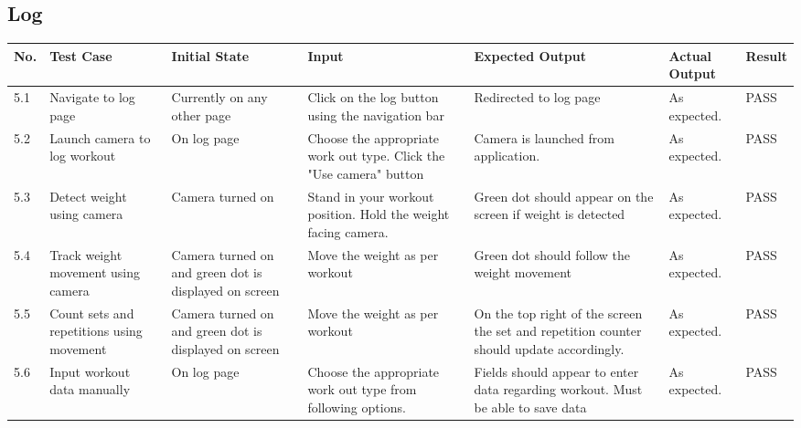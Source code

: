 \documentclass{article}
\begin{document}
\subsection{Log}
\begingroup
\begin{tabular}{ | p{0.5cm} | p{2cm} | p{2cm} | p{2cm} |p{2cm} |p{2cm} |p{1cm} |} 
    \hline
    \textbf{No.} & \textbf{Test Case} & \textbf{Initial State} & \textbf{Input}& \textbf{Expected Output}& \textbf{Actual Output}& \textbf{Result}\\
    \hline
    5.1 & Navigate to log page & Currently on any other page &  Click on the log button using the navigation bar & Redirected to log page & As expected. & PASS\\
    \hline
    5.2 & Launch camera to log workout & On log page & Choose the appropriate work out type. Click the "Use camera" button & Camera is launched from application. & As expected. & PASS\\
    \hline
    5.3 & Detect weight using camera & Camera turned on & Stand in your workout position. Hold the weight facing camera. & Green dot should appear on the screen if weight is detected & As expected. & PASS\\
    \hline
    5.4 & Track weight movement using camera & Camera turned on and green dot is displayed on screen & Move the weight as per workout  & Green dot should follow the weight movement & As expected. & PASS\\
    \hline
    5.5 & Count sets and repetitions using movement & Camera turned on and green dot is displayed on screen & Move the weight as per workout  & On the top right of the screen the set and repetition counter should update accordingly. & As expected. & PASS\\
    \hline
    5.6 & Input workout data manually  & On log page & Choose the appropriate work out type from following options.  & Fields should appear to enter data regarding workout. Must be able to save data & As expected. & PASS\\
    \hline
\end{tabular}
\endgroup
\end{document}
